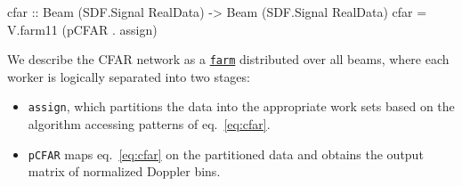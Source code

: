 \documentclass[
  a4paper,
]{article}
\newenvironment{Shaded}{}{}
\newcommand{\DataTypeTok}[1]{\textcolor[rgb]{0.56,0.13,0.00}{#1}}
\newcommand{\FunctionTok}[1]{\textcolor[rgb]{0.02,0.16,0.49}{#1}}
\newcommand{\NormalTok}[1]{#1}
\newcommand{\OtherTok}[1]{\textcolor[rgb]{0.00,0.44,0.13}{#1}}
\begin{document}
\begin{Shaded}
\begin{Highlighting}[numbers=left,,firstnumber=395,]
\OtherTok{cfar ::} \DataTypeTok{Beam}\NormalTok{ (}\DataTypeTok{SDF.Signal} \DataTypeTok{RealData}\NormalTok{)}
     \OtherTok{->} \DataTypeTok{Beam}\NormalTok{ (}\DataTypeTok{SDF.Signal} \DataTypeTok{RealData}\NormalTok{)}
\NormalTok{cfar }\FunctionTok{=}\NormalTok{ V.farm11 (pCFAR }\FunctionTok{.}\NormalTok{ assign)}
\end{Highlighting}
\end{Shaded}

We describe the CFAR network as a
\href{https://forsyde.github.io/forsyde-atom/api/ForSyDe-Atom-Skeleton-Vector.html\#v:farm22}{\texttt{farm}}
distributed over all beams, where each worker is logically separated
into two stages:

\begin{itemize}
\item
  \texttt{assign}, which partitions the data into the appropriate work
  sets based on the algorithm accessing patterns of eq.~\ref{eq:cfar}.
\item
  \texttt{pCFAR} maps eq.~\ref{eq:cfar} on the partitioned data and
  obtains the output matrix of normalized Doppler bins.
\end{itemize}
\end{document}
